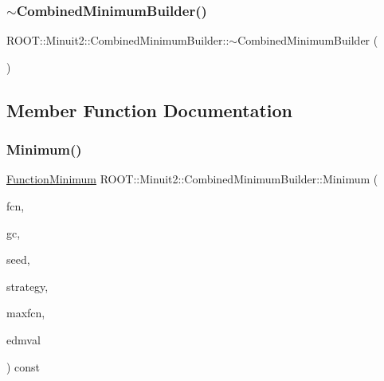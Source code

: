\mbox{\label{classROOT_1_1Minuit2_1_1CombinedMinimumBuilder_a50159966d74446223a77e638aad1dd44}} 
\subsubsection{\texorpdfstring{$\sim$CombinedMinimumBuilder()}{~CombinedMinimumBuilder()}\hspace{0.1cm}{\footnotesize\ttfamily [3/3]}}
{\footnotesize\ttfamily R\+O\+O\+T\+::\+Minuit2\+::\+Combined\+Minimum\+Builder\+::$\sim$\+Combined\+Minimum\+Builder (\begin{DoxyParamCaption}{ }\end{DoxyParamCaption})\hspace{0.3cm}{\ttfamily [inline]}}



\subsection{Member Function Documentation}
\mbox{\label{classROOT_1_1Minuit2_1_1CombinedMinimumBuilder_a44282b6271b536b7fc6b80af16ac67ef}} 
\subsubsection{\texorpdfstring{Minimum()}{Minimum()}\hspace{0.1cm}{\footnotesize\ttfamily [1/3]}}
{\footnotesize\ttfamily \mbox{\hyperlink{classROOT_1_1Minuit2_1_1FunctionMinimum}{Function\+Minimum}} R\+O\+O\+T\+::\+Minuit2\+::\+Combined\+Minimum\+Builder\+::\+Minimum (\begin{DoxyParamCaption}\item[{const \mbox{\hyperlink{classROOT_1_1Minuit2_1_1MnFcn}{Mn\+Fcn}} \&}]{fcn,  }\item[{const \mbox{\hyperlink{classROOT_1_1Minuit2_1_1GradientCalculator}{Gradient\+Calculator}} \&}]{gc,  }\item[{const \mbox{\hyperlink{classROOT_1_1Minuit2_1_1MinimumSeed}{Minimum\+Seed}} \&}]{seed,  }\item[{const \mbox{\hyperlink{classROOT_1_1Minuit2_1_1MnStrategy}{Mn\+Strategy}} \&}]{strategy,  }\item[{unsigned int}]{maxfcn,  }\item[{double}]{edmval }\end{DoxyParamCaption}) const\hspace{0.3cm}{\ttfamily [virtual]}}



